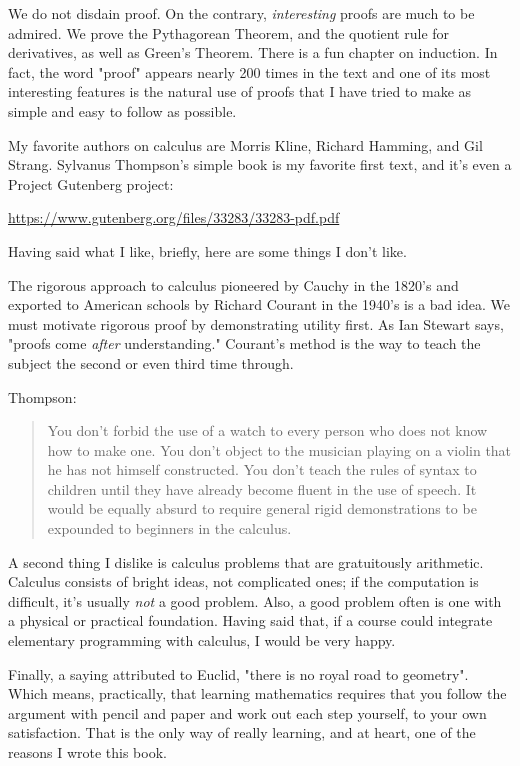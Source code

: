 \documentclass[11pt, oneside]{article}
\begin{document}
We do not disdain proof.  On the contrary, \emph{interesting} proofs are much to be admired.  We prove the Pythagorean Theorem, and the quotient rule for derivatives, as well as Green's Theorem.  There is a fun chapter on induction.  In fact, the word "proof" appears nearly 200 times in the text and one of its most interesting features is the natural use of proofs that I have tried to make as simple and easy to follow as possible.

My favorite authors on calculus are Morris Kline, Richard Hamming, and Gil Strang.  Sylvanus Thompson's simple book is my favorite first text, and it's even a Project Gutenberg project:

\url{https://www.gutenberg.org/files/33283/33283-pdf.pdf}

Having said what I like, briefly, here are some things I don't like.

The rigorous approach to calculus pioneered by Cauchy in the 1820's and exported to American schools by Richard Courant in the 1940's is a bad idea.  We must motivate rigorous proof by demonstrating utility first.  As Ian Stewart says, "proofs come \emph{after} understanding."  Courant's method is the way to teach the subject the second or even third time through.

Thompson:

\begin{quote}
You don't forbid the use of a watch to every person who does not know how to make one. You don't object to the musician playing on a violin that he has not himself constructed. You don't teach the rules of syntax to children until they have already become fluent in the use of speech. It would be equally absurd to require general rigid demonstrations to be expounded to beginners in the calculus.\end{quote}

A second thing I dislike is calculus problems that are gratuitously arithmetic.  Calculus consists of bright ideas, not complicated ones;  if the computation is difficult, it's usually \emph{not} a good problem.  Also, a good problem often is one with a physical or practical foundation.  Having said that, if a course could integrate elementary programming with calculus, I would be very happy.

Finally, a saying attributed to Euclid, "there is no royal road to geometry".  Which means, practically, that learning mathematics requires that you follow the argument with pencil and paper and work out each step yourself, to your own satisfaction.  That is the only way of really learning, and at heart, one of the reasons I wrote this book.
\end{document}
